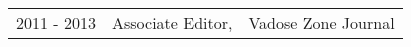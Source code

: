 \documentclass[10pt]{report}
\begin{document}
\begin{longtable}{p{.75in} p{1.1in} p{4.2in}}
2011 - 2013 & Associate Editor, & Vadose Zone Journal \\

\end{longtable}
\end{document}
